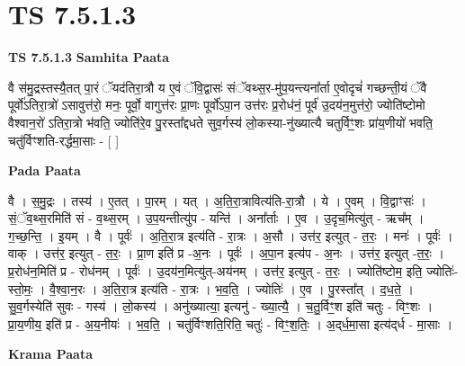 \documentclass[17pt]{extarticle}
\begin{document}
\section{ TS 7.5.1.3 }

\textbf{TS 7.5.1.3 } \newline
\textbf{Samhita Paata} \newline

वै स॑मु॒द्रस्तस्यै॒तत् पा॒रं ॅयद॑तिरा॒त्रौ य ए॒वं ॅवि॒द्वासः॑ संॅवथ्स॒र-मु॑प॒यन्त्यना᳚र्ता ए॒वोदृचं॑ गच्छन्ती॒यं ॅवै पूर्वो॑ऽतिरा॒त्रो॑ ऽसावुत्त॑रो॒ मनः॒ पूर्वो॒ वागुत्त॑रः प्रा॒णः पूर्वो॑ऽपा॒न उत्त॑रः प्र॒रोध॑नं॒ पूर्व॑ उ॒दय॑न॒मुत्त॑रो॒ ज्योति॑ष्टोमो वैश्वान॒रो॑ ऽतिरा॒त्रो भ॑वति॒ ज्योति॑रे॒व पु॒रस्ता᳚द्दधते सुव॒र्गस्य॑ लो॒कस्या-नु॑ख्यात्यै चतुर्विꣳ॒॒शः प्रा॑य॒णीयो॑ भवति॒ चतु॑र्विꣳशति-रर्द्धमा॒साः - [  ] \newline

\textbf{Pada Paata} \newline

वै । स॒मु॒द्रः । तस्य॑ । ए॒तत् । पा॒रम् । यत् । अ॒ति॒रा॒त्रावित्य॑ति-रा॒त्रौ । ये । ए॒वम् । वि॒द्वाꣳसः॑ । सं॒ॅव॒थ्स॒रमिति॑ सं - व॒थ्स॒रम् । उ॒प॒यन्तीत्यु॑प - यन्ति॑ । अना᳚र्ताः । ए॒व । उ॒दृच॒मित्यु॑त् - ऋच᳚म् । ग॒च्छ॒न्ति॒ । इ॒यम् । वै । पूर्वः॑ । अ॒ति॒रा॒त्र इत्य॑ति - रा॒त्रः । अ॒सौ । उत्त॑र॒ इत्युत् - त॒रः॒ । मनः॑ । पूर्वः॑ । वाक् । उत्त॑र॒ इत्युत् - त॒रः॒ । प्रा॒ण इति॑ प्र -अ॒नः । पूर्वः॑ । अ॒पा॒न इत्य॑प -   अ॒नः । उत्त॑र॒ इत्युत् -त॒रः॒ । प्र॒रोध॑न॒मिति॑ प्र - रोध॑नम् । पूर्वः॑ । उ॒दय॑न॒मित्यु॑त्-अय॑नम् । उत्त॑र॒ इत्युत् - त॒रः॒ । ज्योति॑ष्टोम॒ इति॒ ज्योतिः॑-स्तो॒मः॒ । वै॒श्वा॒न॒रः । अ॒ति॒रा॒त्र इत्य॑ति - रा॒त्रः । भ॒व॒ति॒ । ज्योतिः॑ । ए॒व । पु॒रस्ता᳚त् । द॒ध॒ते॒ । सु॒व॒र्गस्येति॑ सुवः - गस्य॑ । लो॒कस्य॑ । अनु॑ख्यात्या॒ इत्यनु॑ - ख्या॒त्यै॒ । च॒तु॒र्विꣳ॒॒श इति॑ चतुः - विꣳ॒॒शः । प्रा॒य॒णीय॒ इति॑ प्र - अ॒य॒नीयः॑ । भ॒व॒ति॒ । चतु॑र्विꣳशति॒रिति॒ चतुः॑ - विꣳ॒॒श॒तिः॒ । अ॒द्‌र्ध॒मा॒सा इत्य॑द्‌र्ध - मा॒साः ।  \newline


\textbf{Krama Paata} \newline
\end{document}
